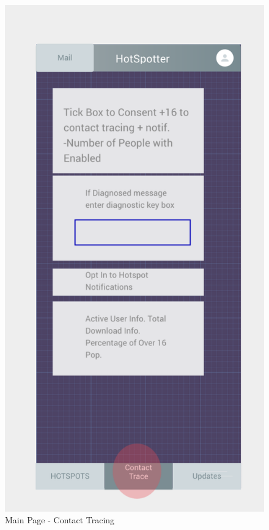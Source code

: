 \documentclass{scrreprt}
\begin{document}
\begin{figure}[H]
	\centering
	\includegraphics[page=1, width=0.9\linewidth]{COMP30830-Contact}
	\caption{Main Page - Contact Tracing}
	\label{Connectivity}
\end{figure}
\end{document}
